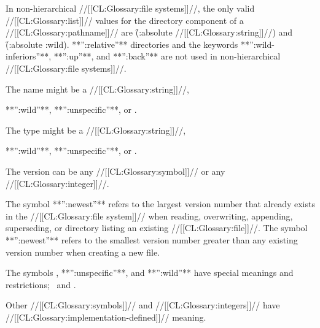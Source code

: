 In non-hierarchical //[[CL:Glossary:file systems]]//,
the only valid //[[CL:Glossary:list]]// values for the directory component of a //[[CL:Glossary:pathname]]//
are \f{(:absolute //[[CL:Glossary:string]]//)} and \f{(:absolute :wild)}.
**'':relative''** directories and the keywords
**'':wild-inferiors''**, **'':up''**, and **'':back''** are not used 
in non-hierarchical //[[CL:Glossary:file systems]]//.

\endsubsubsubsubsection%

\endsubsubsubsection%




The name might be a //[[CL:Glossary:string]]//,

**'':wild''**, **'':unspecific''**, or \nil.

\endsubsubsubsection%




The type might be a //[[CL:Glossary:string]]//,

**'':wild''**, **'':unspecific''**, or \nil.

\endsubsubsubsection%


The version can be any //[[CL:Glossary:symbol]]// or any //[[CL:Glossary:integer]]//.  

The symbol **'':newest''** refers to the largest version number 
that already exists in the //[[CL:Glossary:file system]]//
when reading, overwriting, appending, superseding, or directory listing 
an existing //[[CL:Glossary:file]]//.
The symbol **'':newest''** refers to the smallest version number
greater than any existing version number when creating a new file.

The symbols \nil, **'':unspecific''**, and **'':wild''** have special meanings and
restrictions; \seesection\SpecialComponentValues\ and \secref\ConstructingPathnames.

Other //[[CL:Glossary:symbols]]// and //[[CL:Glossary:integers]]//
have //[[CL:Glossary:implementation-defined]]// meaning.

